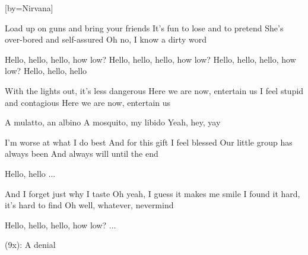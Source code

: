  

[by=Nirvana]


\beginverse
Load up on guns and bring your friends
It's fun to lose and to pretend
She's over-bored and self-assured
Oh no, I know a dirty word
\endverse

\beginchorus
Hello, hello, hello, how low?
Hello, hello, hello, how low?
Hello, hello, hello, how low?
Hello, hello, hello

With the lights out, it's less dangerous
Here we are now, entertain us
I feel stupid and contagious
Here we are now, entertain us

A mulatto, an albino
A mosquito, my libido
Yeah, hey, yay
\endchorus

\beginverse
I'm worse at what I do best
And for this gift I feel blessed
Our little group has always been
And always will until the end
\endverse

\beginchorus
Hello, hello ...
\endchorus

\beginverse
And I forget just why I taste
Oh yeah, I guess it makes me smile
I found it hard, it's hard to find
Oh well, whatever, nevermind
\endverse

\beginverse
Hello, hello, hello, how low?
...

(9x):  A denial
\endverse




\endsong
